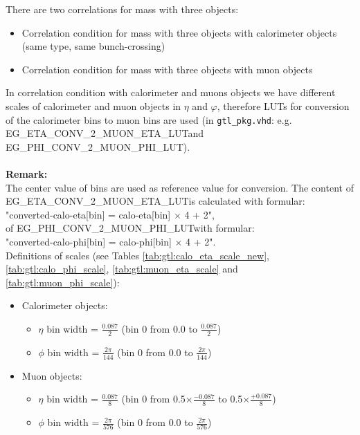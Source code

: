 There are two correlations for mass with three objects:
\begin{itemize}
\item Correlation condition for mass with three objects with calorimeter objects (same type, same bunch-crossing)\\
\item Correlation condition for mass with three objects with muon objects\\
\end{itemize}

In correlation condition with calorimeter and muons objects we have different scales of calorimeter and muon objects in $\eta$ and $\varphi$, therefore LUTs for conversion of the calorimeter bins to muon bins are used (in \texttt{gtl\_pkg.vhd}:
 e.g. \small{EG\_ETA\_CONV\_2\_MUON\_ETA\_LUT}\normalsize  and \small{EG\_PHI\_CONV\_2\_MUON\_PHI\_LUT}\normalsize).\\\\
\textbf{Remark:}\\
The center value of bins are used as reference value for conversion.
The content of \small{EG\_ETA\_CONV\_2\_MUON\_ETA\_LUT}\normalsize is calculated with formular:\\ "converted-calo-eta[bin] = calo-eta[bin] $\times$ 4 + 2",\\
of \small{EG\_PHI\_CONV\_2\_MUON\_PHI\_LUT}\normalsize with formular:\\
"converted-calo-phi[bin] = calo-phi[bin] $\times$ 4 + 2".\\
Definitions of scales (see Tables \ref{tab:gtl:calo_eta_scale_new}, \ref{tab:gtl:calo_phi_scale}, \ref{tab:gtl:muon_eta_scale} and \ref{tab:gtl:muon_phi_scale}):
\begin{itemize}
\item Calorimeter objects:
    \begin{itemize}
    \item $\eta$ bin width = $\frac{0.087}{2}$ (bin 0 from 0.0 to $\frac{0.087}{2}$)
    \item $\phi$ bin width = $\frac{2\pi}{144}$ (bin 0 from 0.0 to $\frac{2\pi}{144}$)
    \end{itemize}
\item Muon objects:
    \begin{itemize}
    \item $\eta$ bin width = $\frac{0.087}{8}$ (bin 0 from \small{0.5}$\times\frac{-0.087}{8}$ to \small{0.5}$\times\frac{+0.087}{8}$)
    \item $\phi$ bin width = $\frac{2\pi}{576}$ (bin 0 from 0.0 to $\frac{2\pi}{576}$)
    \end{itemize}
\end{itemize}

